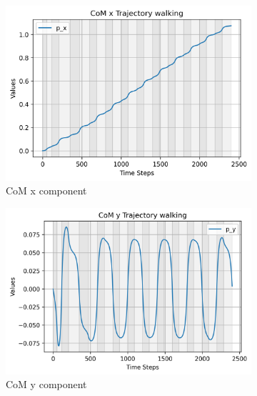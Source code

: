 \documentclass[main.tex]{subfiles}
\begin{document}
\begin{figure}[H]
    \centering
    \begin{subfigure}[b]{0.32\textwidth}
        \centering
        \includegraphics[width=\textwidth]{figures/CoM x Trajectory walking.png}
        \caption{CoM x component}
        \label{fig:sub1}
    \end{subfigure}
    \hfill
    \begin{subfigure}[b]{0.32\textwidth}
        \centering
        \includegraphics[width=\textwidth]{figures/CoM y Trajectory walking.png}
        \caption{CoM y component}
        \label{fig:sub2}
    \end{subfigure}
    \hfill
    \begin{subfigure}[b]{0.32\textwidth}
        \centering

\end{subfigure}
\end{figure}
\end{document}
